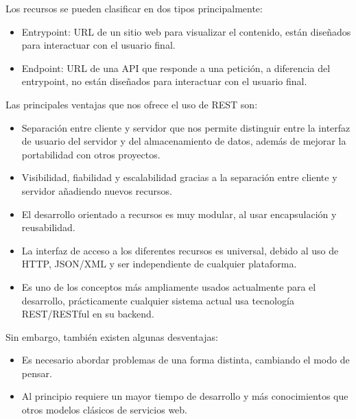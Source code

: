Los recursos se pueden clasificar en dos tipos principalmente:
\begin{itemize}
	\item Entrypoint: URL de un sitio web para visualizar el contenido, están diseñados para interactuar con el usuario final.
	\item Endpoint: URL de una API que responde a una petición, a diferencia del entrypoint, no están diseñados para interactuar con el usuario final.
\end{itemize}
Las principales ventajas que nos ofrece el uso de REST son:
\begin{itemize}
	\item Separación entre cliente y servidor que nos permite distinguir entre la interfaz de usuario del servidor y del almacenamiento de datos, además de mejorar la portabilidad con otros proyectos.
	\item Visibilidad, fiabilidad y escalabilidad gracias a la separación entre cliente y servidor añadiendo nuevos recursos.
	\item El desarrollo orientado a recursos es muy modular, al usar encapsulación y reusabilidad.
	\item La interfaz de acceso a los diferentes recursos es universal, debido al uso de HTTP, JSON/XML y ser independiente de cualquier plataforma.
	\item Es uno de los conceptos más ampliamente usados actualmente para el desarrollo, prácticamente cualquier sistema actual usa tecnología REST/RESTful en su backend.
\end{itemize}
Sin embargo, también existen algunas desventajas:
\begin{itemize}
	\item Es necesario abordar problemas de una forma distinta, cambiando el modo de pensar.
	\item Al principio requiere un mayor tiempo de desarrollo y más conocimientos que otros modelos clásicos de servicios web.
\end{itemize}
